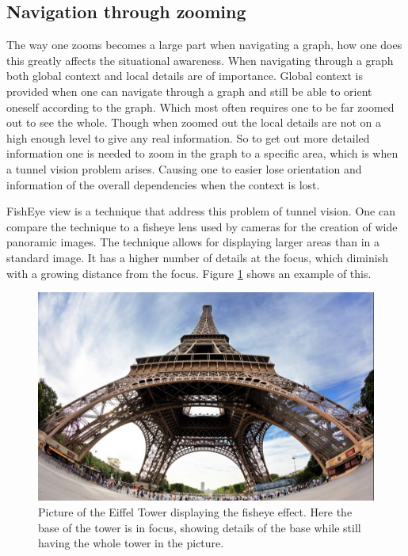 \documentclass[a4paper,11pt]{kth-mag}
\begin{document}
\subsection{Navigation through zooming}
The way one zooms becomes a large part when navigating a graph, how one does this greatly affects the situational awareness. When navigating through a graph both global context and local details are of importance. Global context
is provided when one can navigate through a graph and still be able to orient oneself according to the graph. Which most often requires one to be far zoomed out to see the whole. Though when zoomed out the local details are not 
on a high enough level to give any real information. So to get out more detailed information one is needed to zoom in the graph to a specific area, which is when a tunnel vision problem arises. 
Causing one to easier lose orientation and information of the overall dependencies when the context is lost.

FishEye view is a technique that address this problem of tunnel vision. One can compare the technique to a fisheye lens used by cameras for the creation of wide panoramic images. The technique allows for displaying  
larger areas than in a standard image. It has a higher number of details at the focus, which diminish with a growing distance from the focus. Figure \ref{fig:FishEye} shows an example of this. 

\begin{figure}[!htbp]
	\centering
	\includegraphics[scale=0.3]{FishEyeEiffel}
	\caption{Picture of the Eiffel Tower displaying the fisheye effect. Here the base of the tower is in focus, showing details of the base while still having the whole tower in the picture.}
	\label{fig:FishEye}
\end{figure}
\end{document}
